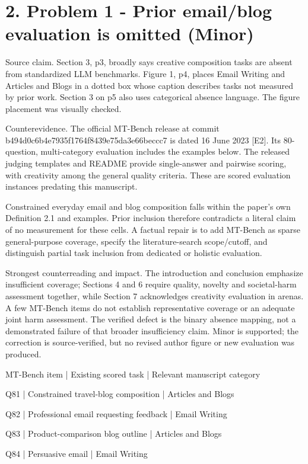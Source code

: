 \documentclass[10pt]{article}
\begin{document}
\section*{2. Problem 1 - Prior email/blog evaluation is omitted (Minor)}
Source claim. Section 3, p3, broadly says creative composition tasks are absent from standardized LLM benchmarks. Figure 1, p4, places Email Writing and Articles and Blogs in a dotted box whose caption describes tasks not measured by prior work. Section 3 on p5 also uses categorical absence language. The figure placement was visually checked.\par
Counterevidence. The official MT-Bench release at commit b494d0c6b4e7935f1764f8439e75da3e66beccc7 is dated 16 June 2023 [E2]. Its 80-question, multi-category evaluation includes the examples below. The released judging templates and README provide single-answer and pairwise scoring, with creativity among the general quality criteria. These are scored evaluation instances predating this manuscript.\par
Constrained everyday email and blog composition falls within the paper’s own Definition 2.1 and examples. Prior inclusion therefore contradicts a literal claim of no measurement for these cells. A factual repair is to add MT-Bench as sparse general-purpose coverage, specify the literature-search scope/cutoff, and distinguish partial task inclusion from dedicated or holistic evaluation.\par
Strongest counterreading and impact. The introduction and conclusion emphasize insufficient coverage; Sections 4 and 6 require quality, novelty and societal-harm assessment together, while Section 7 acknowledges creativity evaluation in arenas. A few MT-Bench items do not establish representative coverage or an adequate joint harm assessment. The verified defect is the binary absence mapping, not a demonstrated failure of that broader insufficiency claim. Minor is supported; the correction is source-verified, but no revised author figure or new evaluation was produced.\par
MT-Bench item | Existing scored task | Relevant manuscript category\par
Q81 | Constrained travel-blog composition | Articles and Blogs\par
Q82 | Professional email requesting feedback | Email Writing\par
Q83 | Product-comparison blog outline | Articles and Blogs\par
Q84 | Persuasive email | Email Writing\par
\end{document}
